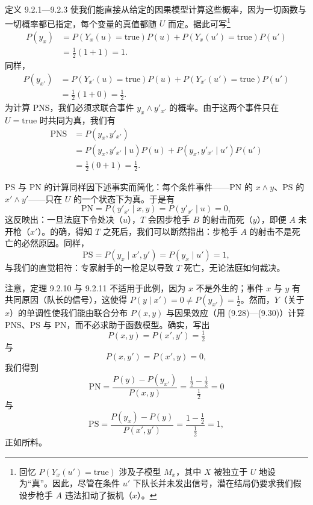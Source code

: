 定义 9.2.1—9.2.3 使我们能直接从给定的因果模型计算这些概率，因为一切函数与一切概率都已指定，每个变量的真值都随 $U$ 而定。据此可写\footnote{回忆 $P(Y_x(u')=\text{true})$ 涉及子模型 $M_x$，其中 $X$ 被独立于 $U$ 地设为“真”。因此，尽管在条件 $u'$ 下队长并未发出信号，潜在结局仍要求我们假设步枪手 $A$ 违法扣动了扳机（$x$）。}
\begin{equation}
\begin{aligned}
P(y_x) &= P(Y_x(u)=\text{true})P(u)+P(Y_x(u')=\text{true})P(u')\\
&= \tfrac12(1+1)=1.
\end{aligned} \tag{9.37}
\end{equation}
同样，
\begin{equation}
\begin{aligned}
P(y_{x'}) &= P(Y_{x'}(u)=\text{true})P(u)+P(Y_{x'}(u')=\text{true})P(u')\\
&= \tfrac12(1+0)=\tfrac12.
\end{aligned} \tag{9.38}
\end{equation}
为计算 PNS，我们必须求联合事件 $y_x\wedge y'_{x'}$ 的概率。由于这两个事件只在 $U=\text{true}$ 时共同为真，我们有
\begin{equation}
\begin{aligned}
\mathrm{PNS} &= P(y_x,y'_{x'})\\
&= P(y_x,y'_{x'}\mid u)P(u)+P(y_x,y'_{x'}\mid u')P(u')\\
&= \tfrac12(0+1)=\tfrac12.
\end{aligned} \tag{9.39}
\end{equation}

PS 与 PN 的计算同样因下述事实而简化：每个条件事件——PN 的 $x\wedge y$、PS 的 $x'\wedge y'$——只在 $U$ 的一个状态下为真。于是有
\[
\mathrm{PN}=P(y'_{x'}\mid x,y)=P(y'_{x'}\mid u)=0,
\]
这反映出：一旦法庭下令处决（$u$），$T$ 会因步枪手 $B$ 的射击而死（$y$），即便 $A$ 未开枪（$x'$）。的确，得知 $T$ 之死后，我们可以断然指出：步枪手 $A$ 的射击不是死亡的必然原因。同样，
\[
\mathrm{PS}=P(y_x\mid x',y')=P(y_x\mid u')=1,
\]
与我们的直觉相符：专家射手的一枪足以导致 $T$ 死亡，无论法庭如何裁决。

注意，定理 9.2.10 与 9.2.11 不适用于此例，因为 $x$ 不是外生的；事件 $x$ 与 $y$ 有共同原因（队长的信号），这使得 $P(y\mid x')=0\ne P(y_{x'})=\frac12$。然而，$Y$（关于 $x$）的单调性使我们能由联合分布 $P(x,y)$ 与因果效应（用 \textup{(9.28)}—\textup{(9.30)}）计算 PNS、PS 与 PN，而不必求助于函数模型。确实，写出
\begin{equation}
P(x,y)=P(x',y')=\tfrac12 \tag{9.40}
\end{equation}
与
\begin{equation}
P(x,y')=P(x',y)=0, \tag{9.41}
\end{equation}
我们得到
\begin{equation}
\mathrm{PN}=\frac{P(y)-P(y_{x'})}{P(x,y)}=\frac{\tfrac12-\tfrac12}{\tfrac12}=0 \tag{9.42}
\end{equation}
与
\begin{equation}
\mathrm{PS}=\frac{P(y_x)-P(y)}{P(x',y')}=\frac{1-\tfrac12}{\tfrac12}=1, \tag{9.43}
\end{equation}
正如所料。

